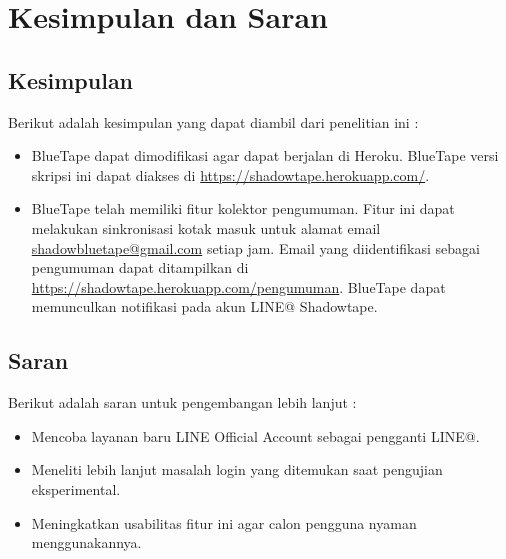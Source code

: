 \chapter{Kesimpulan dan Saran}
\section{Kesimpulan}
Berikut adalah kesimpulan yang dapat diambil dari penelitian ini :
\begin{itemize}
    \item BlueTape dapat dimodifikasi agar dapat berjalan di Heroku. BlueTape versi skripsi ini dapat diakses di \url{https://shadowtape.herokuapp.com/}.
    \item BlueTape telah memiliki fitur kolektor pengumuman. Fitur ini dapat melakukan sinkronisasi kotak masuk untuk alamat email \href{mailto:shadowbluetape@gmail.com}{shadowbluetape@gmail.com} setiap jam. Email yang diidentifikasi sebagai pengumuman dapat ditampilkan di \url{https://shadowtape.herokuapp.com/pengumuman}. BlueTape dapat memunculkan notifikasi pada akun LINE@ Shadowtape.
\end{itemize}

\section{Saran}
Berikut adalah saran untuk pengembangan lebih lanjut :
\begin{itemize}
    \item Mencoba layanan baru LINE Official Account sebagai pengganti LINE@.
    \item Meneliti lebih lanjut masalah login yang ditemukan saat pengujian eksperimental.
    \item Meningkatkan usabilitas fitur ini agar calon pengguna nyaman menggunakannya.
\end{itemize}